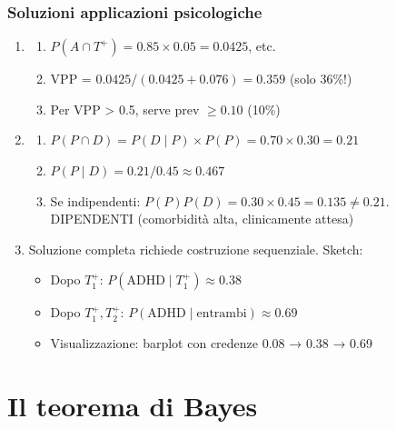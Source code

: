 \documentclass[
  letterpaper,
  DIV=11,
  numbers=noendperiod,
  oneside]{scrreprt}
\providecommand{\tightlist}{%
  \setlength{\itemsep}{0pt}\setlength{\parskip}{0pt}}
\theoremstyle{definition}
\theoremstyle{plain}
\theoremstyle{definition}
\theoremstyle{remark}
\begin{document}
\begin{tcolorbox}
\subsection{Soluzioni applicazioni
psicologiche}\label{soluzioni-applicazioni-psicologiche}

\begin{enumerate}
\def\labelenumi{\arabic{enumi}.}
\setcounter{enumi}{19}
\tightlist
\item
  \begin{enumerate}
  \def\labelenumii{\alph{enumii}.}
  \tightlist
  \item
    \(P(A \cap T^+) = 0.85 \times 0.05 = 0.0425\), etc.
  \item
    VPP = \(0.0425 / (0.0425 + 0.076) = 0.359\) (solo 36\%!)
  \item
    Per VPP \textgreater{} 0.5, serve prev \(\geq 0.10\) (10\%)
  \end{enumerate}
\item
  \begin{enumerate}
  \def\labelenumii{\alph{enumii}.}
  \tightlist
  \item
    \(P(P \cap D) = P(D \mid P) \times P(P) = 0.70 \times 0.30 = 0.21\)
  \item
    \(P(P \mid D) = 0.21 / 0.45 \approx 0.467\)
  \item
    Se indipendenti: \(P(P) P(D) = 0.30 \times 0.45 = 0.135 \neq 0.21\).
    DIPENDENTI (comorbidità alta, clinicamente attesa)
  \end{enumerate}
\item
  Soluzione completa richiede costruzione sequenziale. Sketch:

  \begin{itemize}
  \tightlist
  \item
    Dopo \(T_1^+\): \(P(\text{ADHD} \mid T_1^+) \approx 0.38\)
  \item
    Dopo \(T_1^+, T_2^+\):
    \(P(\text{ADHD} \mid \text{entrambi}) \approx 0.69\)
  \item
    Visualizzazione: barplot con credenze 0.08 → 0.38 → 0.69
  \end{itemize}
\end{enumerate}

\end{tcolorbox}

\chapter{Il teorema di Bayes}\label{sec-prob-bayes-theorem}
\end{document}
